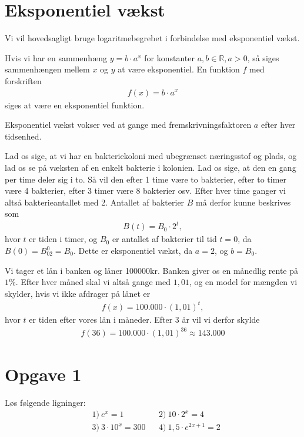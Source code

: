 \section*{Eksponentiel vækst}
Vi vil hovedsagligt bruge logaritmebegrebet i forbindelse med eksponentiel vækst. 
\begin{defn}
Hvis vi har en sammenhæng $y = b\cdot a^x$ for konstanter $a,b\in \mathbb{R}, a>0$, så siges sammenhængen mellem $x$ og $y$ at være eksponentiel. En funktion $f$ med forskriften
\begin{align*}
f(x) = b\cdot a^x
\end{align*}
siges at være en eksponentiel funktion. 
\end{defn}
Eksponentiel vækst vokser ved at gange med fremskrivningsfaktoren $a$ efter hver tidsenhed.
\begin{exa}\label{exa:bacteria}
Lad os sige, at vi har en bakteriekoloni med ubegrænset næringsstof og plads, og lad os se på væksten af en enkelt bakterie i kolonien. Lad os sige, at den en gang per time deler sig i to. Så vil den efter 1 time være to bakterier, efter to timer være 4 bakterier, efter 3 timer være 8 bakterier osv. Efter hver time ganger vi altså bakterieantallet med 2. Antallet af bakterier $B$ må derfor kunne beskrives som 
\begin{align*}
B(t) = B_0\cdot 2^t,
\end{align*}
hvor $t$ er tiden i timer, og $B_0$ er antallet af bakterier til tid $t=0$, da $B(0) = B_02^0 = B_0.$
Dette er eksponentiel vækst, da $a = 2$, og $b = B_0$.
\end{exa}
\begin{exa}\label{exa:loan}
Vi tager et lån i banken og låner 100000kr. Banken giver os en månedlig rente på $1\%$. Efter hver måned skal vi altså gange med $1,01$, og en model for mængden vi skylder, hvis vi ikke afdrager på lånet er
\begin{align*}
f(x) = 100.000\cdot (1,01)^t,
\end{align*}
hvor $t$ er tiden efter vores lån i måneder. Efter 3 år vil vi derfor skylde
\begin{align*}
f(36) = 100.000\cdot (1,01)^{36} \approx 143.000
\end{align*}
\end{exa} 
\section*{Opgave 1}
Løs følgende ligninger:
\begin{align*}
&1) \  e^x = 1  &&2) \ 10\cdot 2^x = 4   \\
&3) \ 3\cdot 10^x = 300   &&4) \ 1,5\cdot e^{2x+1} = 2   \\
\end{align*}

